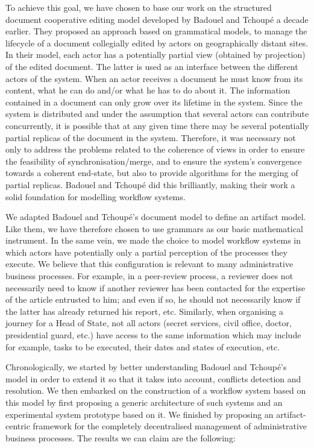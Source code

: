 To achieve this goal, we have chosen to base our work on the structured document cooperative editing model developed by Badouel and Tchoup\'e a decade earlier. They proposed an approach based on grammatical models, to manage the lifecycle of a document collegially edited by actors on geographically distant sites. In their model, each actor has a potentially partial view (obtained by projection) of the edited document. The latter is used as an interface between the different actors of the system. When an actor receives a document he must know from its content, what he can do and/or what he has to do about it. The information contained in a document can only grow over its lifetime in the system. Since the system is distributed and under the assumption that several actors can contribute concurrently, it is possible that at any given time there may be several potentially partial replicas of the document in the system. Therefore, it was necessary not only to address the problems related to the coherence of views in order to ensure the feasibility of synchronisation/merge, and to ensure the system's convergence towards a coherent end-state, but also to provide algorithms for the merging of partial replicas. Badouel and Tchoup\'e did this brilliantly, making their work a solid foundation for modelling workflow systems.

We adapted Badouel and Tchoup\'e's document model to define an artifact model. Like them, we have therefore chosen to use grammars as our basic mathematical instrument. In the same vein, we made the choice to model workflow systems in which actors have potentially only a partial perception of the processes they execute. We believe that this configuration is relevant to many administrative business processes. For example, in a peer-review process, a reviewer does not necessarily need to know if another reviewer has been contacted for the expertise of the article entrusted to him; and even if so, he should not necessarily know if the latter has already returned his report, etc. 
Similarly, when organising a journey for a Head of State, not all actors (secret services, civil office, doctor, presidential guard, etc.) have access to the same information which may include for example, tasks to be executed, their dates and states of execution, etc.



Chronologically, we started by better understanding Badouel and Tchoup\'e's model in order to extend it so that it takes into account, conflicts detection and resolution. We then embarked on the construction of a workflow system based on this model by first proposing a generic architecture of such systems and an experimental system prototype based on it. We finished by proposing an artifact-centric framework for the completely decentralised management of administrative business processes. The results we can claim are the following:

